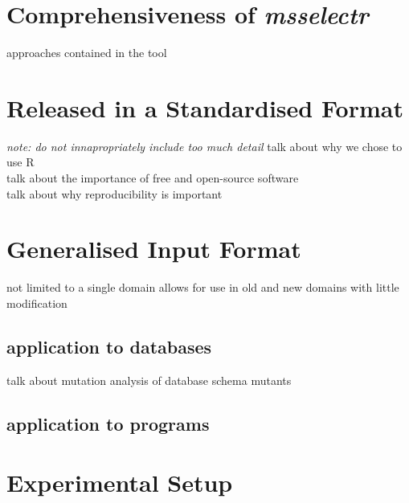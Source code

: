 \documentclass[conference]{IEEEtran}
\begin{document}
\section{Comprehensiveness of \textit{msselectr}}
approaches contained in the tool

\section{Released in a Standardised Format}
\textit{note: do not innapropriately include too much detail}
talk about why we chose to use R \\
talk about the importance of free and open-source software \\
talk about why reproducibility is important

\section{Generalised Input Format}
not limited to a single domain
allows for use in old and new domains with little modification
    \subsection{application to databases}
    talk about mutation analysis of database schema mutants
    \subsection{application to programs}

\section{Experimental Setup}
\end{document}
